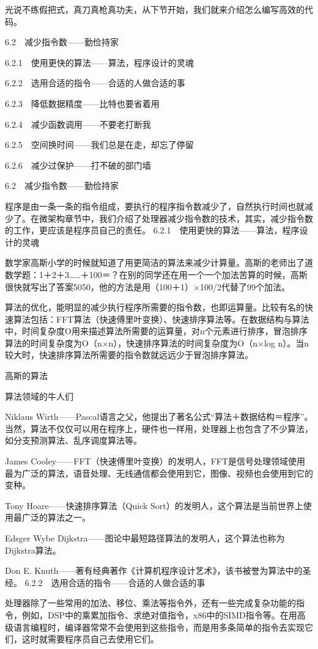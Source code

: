 \documentclass[12pt,UTF8]{ctexbook}
\begin{document}
光说不练假把式，真刀真枪真功夫，从下节开始，我们就来介绍怎么编写高效的代码。


6.2　减少指令数——勤俭持家

6.2.1　使用更快的算法——算法，程序设计的灵魂

6.2.2　选用合适的指令——合适的人做合适的事

6.2.3　降低数据精度——比特也要省着用

6.2.4　减少函数调用——不要老打断我

6.2.5　空间换时间——我们总是在走，却忘了停留

6.2.6　减少过保护——打不破的部门墙


6.2　减少指令数——勤俭持家

程序是由一条一条的指令组成，要执行的程序指令数减少了，自然执行时间也就减少了。在微架构章节中，我们介绍了处理器减少指令数的技术，其实，减少指令数的工作，更应该是程序员自己的责任。
6.2.1　使用更快的算法——算法，程序设计的灵魂

数学家高斯小学的时候就知道了用更简洁的算法来减少计算量。高斯的老师出了道数学题：1＋2＋3……＋100＝？在别的同学还在用一个一个加法苦算的时候，高斯很快就写出了答案5050，他的方法是用（100＋1）×100/2代替了99个加法。

算法的优化，能明显的减少执行程序所需要的指令数，也即运算量。比较有名的快速算法包括：FFT算法（快速傅里叶变换）、快速排序算法等。在数据结构与算法中，时间复杂度O用来描述算法所需要的运算量，对n个元素进行排序，冒泡排序算法的时间复杂度为O（n×n），快速排序算法的时间复杂度为O（n×log n）。当n较大时，快速排序算法所需要的指令数就远远少于冒泡排序算法。

高斯的算法

算法领域的牛人们

Niklaus Wirth——Pascal语言之父，他提出了著名公式“算法＋数据结构＝程序”。当然，算法不仅仅可以用在程序上，硬件也一样用，处理器上也包含了不少算法，如分支预测算法、乱序调度算法等。

James Cooley——FFT（快速傅里叶变换）的发明人，FFT是信号处理领域使用最为广泛的算法，语音处理、无线通信都会使用到它，图像、视频也会使用到它的变种。

Tony Hoare——快速排序算法（Quick Sort）的发明人，这个算法是当前世界上使用最广泛的算法之一。

Edsger Wybe Dijkstra——图论中最短路径算法的发明人，这个算法也称为Dijkstra算法。

Don E. Knuth——著有经典著作《计算机程序设计艺术》，该书被誉为算法中的圣经。
6.2.2　选用合适的指令——合适的人做合适的事

处理器除了一些常用的加法、移位、乘法等指令外，还有一些完成复杂功能的指令，例如，DSP中的乘累加指令、求绝对值指令，x86中的SIMD指令等。在用高级语言编程时，编译器常常不会使用到这些指令，而是用多条简单的指令去实现它们，这时就需要程序员自己去使用它们。
\end{document}
